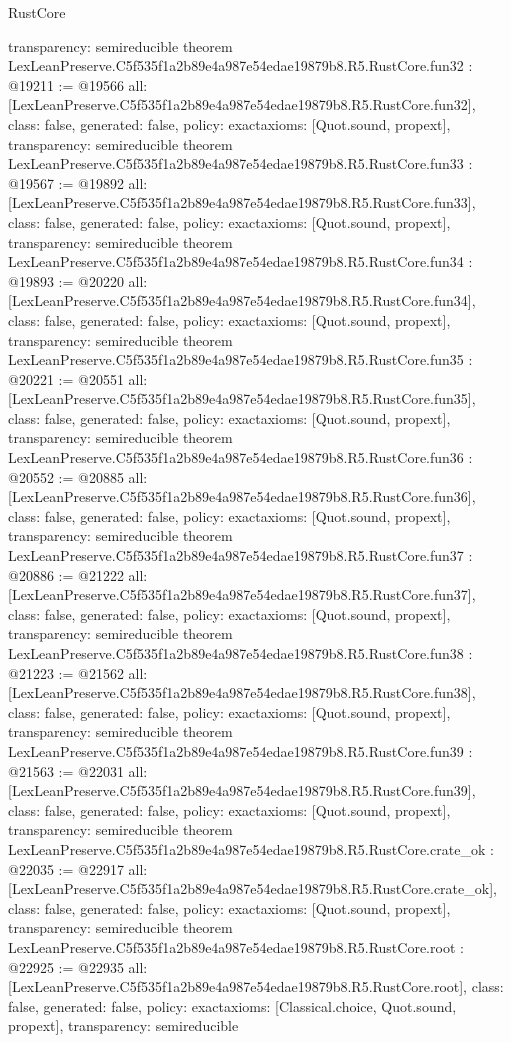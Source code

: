 \begin{lexlean}{RustCore}
\begin{coremodule}
{  transparency: semireducible
}
theorem LexLeanPreserve.C5f535f1a2b89e4a987e54edae19879b8.R5.RustCore.fun32 : @19211 := @19566 {
  all: [LexLeanPreserve.C5f535f1a2b89e4a987e54edae19879b8.R5.RustCore.fun32],
  class: false,
  generated: false,
  policy: exact{axioms: [Quot.sound, propext]},
  transparency: semireducible
}
theorem LexLeanPreserve.C5f535f1a2b89e4a987e54edae19879b8.R5.RustCore.fun33 : @19567 := @19892 {
  all: [LexLeanPreserve.C5f535f1a2b89e4a987e54edae19879b8.R5.RustCore.fun33],
  class: false,
  generated: false,
  policy: exact{axioms: [Quot.sound, propext]},
  transparency: semireducible
}
theorem LexLeanPreserve.C5f535f1a2b89e4a987e54edae19879b8.R5.RustCore.fun34 : @19893 := @20220 {
  all: [LexLeanPreserve.C5f535f1a2b89e4a987e54edae19879b8.R5.RustCore.fun34],
  class: false,
  generated: false,
  policy: exact{axioms: [Quot.sound, propext]},
  transparency: semireducible
}
theorem LexLeanPreserve.C5f535f1a2b89e4a987e54edae19879b8.R5.RustCore.fun35 : @20221 := @20551 {
  all: [LexLeanPreserve.C5f535f1a2b89e4a987e54edae19879b8.R5.RustCore.fun35],
  class: false,
  generated: false,
  policy: exact{axioms: [Quot.sound, propext]},
  transparency: semireducible
}
theorem LexLeanPreserve.C5f535f1a2b89e4a987e54edae19879b8.R5.RustCore.fun36 : @20552 := @20885 {
  all: [LexLeanPreserve.C5f535f1a2b89e4a987e54edae19879b8.R5.RustCore.fun36],
  class: false,
  generated: false,
  policy: exact{axioms: [Quot.sound, propext]},
  transparency: semireducible
}
theorem LexLeanPreserve.C5f535f1a2b89e4a987e54edae19879b8.R5.RustCore.fun37 : @20886 := @21222 {
  all: [LexLeanPreserve.C5f535f1a2b89e4a987e54edae19879b8.R5.RustCore.fun37],
  class: false,
  generated: false,
  policy: exact{axioms: [Quot.sound, propext]},
  transparency: semireducible
}
theorem LexLeanPreserve.C5f535f1a2b89e4a987e54edae19879b8.R5.RustCore.fun38 : @21223 := @21562 {
  all: [LexLeanPreserve.C5f535f1a2b89e4a987e54edae19879b8.R5.RustCore.fun38],
  class: false,
  generated: false,
  policy: exact{axioms: [Quot.sound, propext]},
  transparency: semireducible
}
theorem LexLeanPreserve.C5f535f1a2b89e4a987e54edae19879b8.R5.RustCore.fun39 : @21563 := @22031 {
  all: [LexLeanPreserve.C5f535f1a2b89e4a987e54edae19879b8.R5.RustCore.fun39],
  class: false,
  generated: false,
  policy: exact{axioms: [Quot.sound, propext]},
  transparency: semireducible
}
theorem LexLeanPreserve.C5f535f1a2b89e4a987e54edae19879b8.R5.RustCore.crate_ok : @22035 := @22917 {
  all: [LexLeanPreserve.C5f535f1a2b89e4a987e54edae19879b8.R5.RustCore.crate_ok],
  class: false,
  generated: false,
  policy: exact{axioms: [Quot.sound, propext]},
  transparency: semireducible
}
theorem LexLeanPreserve.C5f535f1a2b89e4a987e54edae19879b8.R5.RustCore.root : @22925 := @22935 {
  all: [LexLeanPreserve.C5f535f1a2b89e4a987e54edae19879b8.R5.RustCore.root],
  class: false,
  generated: false,
  policy: exact{axioms: [Classical.choice, Quot.sound, propext]},
  transparency: semireducible
}


\end{coremodule}
\end{lexlean}
